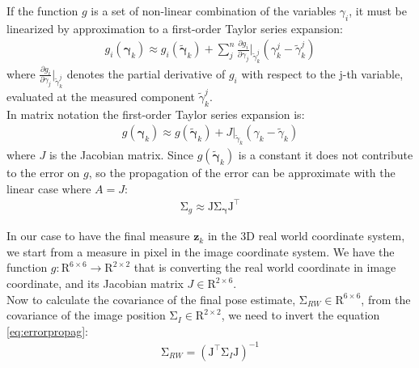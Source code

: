If the function $g$ is a set of non-linear combination of the variables $\gamma_i$,  it must be linearized by approximation to a first-order Taylor series expansion:
\begin{align}
g_{i}(\boldsymbol{\gamma}_{k}) \approx g_{i}(\tilde{\boldsymbol{\gamma}}_{k})+\sum _{j}^{n}{\frac  {\partial g_{i}}{\partial {\gamma_{j}}}}\Big|_{\tilde{\gamma}_k^{j}}(\gamma_k^{j}-\tilde{\gamma}_k^{j})
\end{align}
where ${\frac  {\partial g_{i}}{\partial {\gamma_{j}}}}\Big|_{\tilde{\gamma}_k^{j}}$ denotes the partial derivative of $g_i$ with respect to the j-th variable, evaluated at the measured component $\tilde{\gamma}_k^{j}$.\\
In matrix notation the first-order Taylor series expansion is:
\begin{align}
g(\boldsymbol{\gamma}_{k}) \approx g(\tilde{\boldsymbol{\gamma}}_{k})+J\Big|_{\tilde{\gamma}_k}(\gamma_k-\tilde{\gamma}_k)
\end{align}
where $J$ is the Jacobian matrix. Since $g(\tilde{\boldsymbol{\gamma}}_{k})$ is a constant it does not contribute to the error on $g$, so the propagation of the error can be approximate with the linear case where $A = J$:
\begin{align}
{\displaystyle \mathrm {\Sigma }_g\approx \mathrm {J} \mathrm {\Sigma }_{\boldsymbol{\gamma}}\mathrm {J} ^{\top}} 
\label{eq:errorpropag}
\end{align}

In our case to have the final measure $\boldsymbol{z}_k$  in the 3D real world coordinate system, we start from a measure in pixel in the image coordinate system. We have the function $g : \mathrm{R}^{6 \times 6} \to \mathrm{R}^{2 \times 2} $ that is converting the real world coordinate in image coordinate, and its Jacobian matrix $J \in \mathrm{R}^{2 \times 6} $.\\
Now to calculate the covariance of the final pose estimate, $\mathrm {\Sigma }_{RW} \in \mathrm{R}^{6 \times 6} $, from the covariance of the image position  $\mathrm {\Sigma }_{I} \in \mathrm{R}^{2 \times 2} $, we need to invert the equation \ref{eq:errorpropag}:
\begin{align}
{\displaystyle \mathrm{\Sigma}_{RW} = ( \mathrm{J}^{\top} \mathrm{\Sigma }_{I} \mathrm{J})^{-1} } 
\label{eq:errorpropag}
\end{align}

